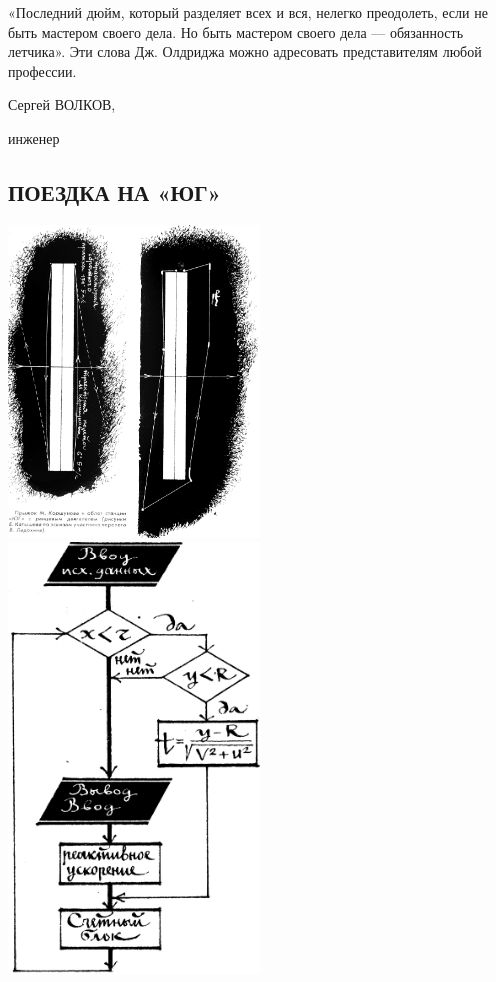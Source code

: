 \documentclass[11pt,a4paper,oneside]{article}
\begin{document}
«Последний дюйм, который разделяет всех и вся, нелегко преодолеть, если не быть мастером своего дела. Но быть мастером своего дела — обязанность летчика». Эти слова Дж. Олдриджа можно адресовать представителям любой профессии.

Сергей ВОЛКОВ,

инженер

\subsection{ПОЕЗДКА НА «ЮГ»}
\includegraphics[width=0.5\textwidth]{jump_to_ug}
\includegraphics[width=0.5\textwidth]{jump_to_ug2}
\end{document}
